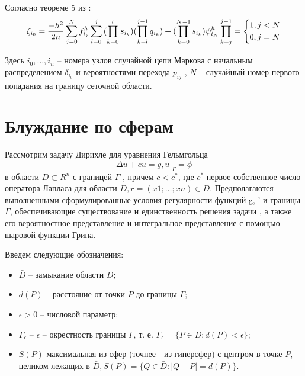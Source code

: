 Согласно теореме 5 из \cite{luk:dis}:
\begin{equation}
	\xi_{i_{0}}=\frac{-h^{2}}{2n}\sum^{N}_{j=0}{f^{h}_{i_{j}}}\sum^{j}_{l=0}{(\prod^{l}_{k=0}{s_{i_{k}}})(\prod^{j-1}_{k=l}{q_{i_{k}}})+(\prod^{N-1}_{k=0}{s_{i_{k}}})\psi^{h}_{i_{N}}}\\
	\prod^{j-1}_{k=j}=\left\{
\begin{aligned}
& 1, j<N\\ & 0, j=N
\end{aligned}
 \right.
\end{equation}

Здесь $i_{0},\dots,i_{n}$ -- номера узлов случайной цепи Маркова с начальным
распределением $\delta_{i_{0}} $ и вероятностями перехода $p_{ij}$ , $N$ -- случайный номер
первого попадания на границу сеточной области.
\section{Блуждание по сферам}
Рассмотрим задачу Дирихле для уравнения Гельмгольца
\begin{equation} \Delta u + cu = g,	 u|_{\Gamma} = \phi \end{equation}
в области $D \subset R^{n}$ с границей $\Gamma$ , причем $c < c^{*}$, где $c^{*}$ первое собственное число оператора Лапласа для области $D, r = (x1;\dots; xn) \in D$. Предполагаются выполненными сформулированные условия регулярности функций g, ' и границы $\Gamma$, обеспечивающие существование и единственность решения задачи , а также его вероятностное представление и интегральное представление с помощью шаровой функции Грина.

Введем следующие обозначения:
\begin{itemize}
	\item $\bar{D}$  -- замыкание области $D$;
	\item $d(P)$ -- расстояние от точки $P$ до границы $\Gamma$;
	\item $\epsilon > 0 $ -- числовой параметр;
	\item $\Gamma_{\epsilon }$ -- $\epsilon$ -- окрестность границы $\Gamma$, т. е. $ \Gamma_{\epsilon }=\{ P \in \bar{D}:d(P) < \epsilon \} $;
	\item $S(P)$  максимальная из сфер (точнее - из гиперсфер) с центром в точке $P$, целиком лежащих в $\bar{D}, S(P) = \{Q \in \bar{D}: |Q - P| = d(P)\}$.
\end{itemize}

